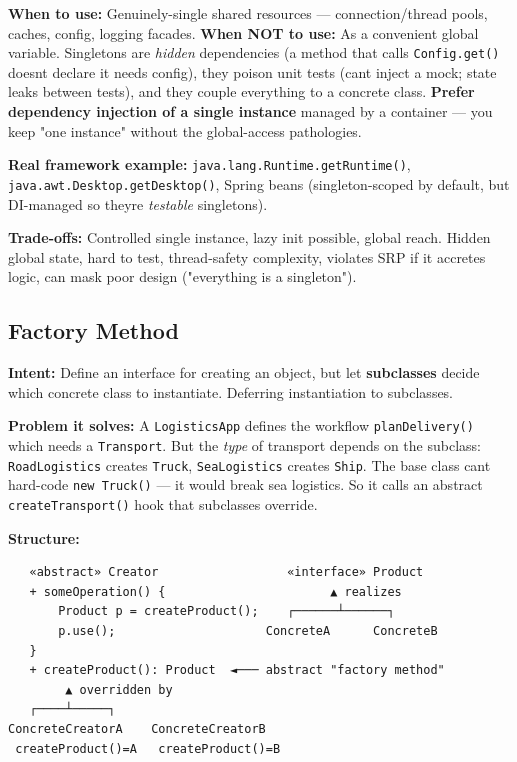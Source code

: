 \documentclass[11pt]{article}
\begin{document}
\textbf{When to use:} Genuinely-single shared resources --- connection/thread pools, caches, config, logging facades. \textbf{When NOT to use:} As a convenient global variable. Singletons are \emph{hidden} dependencies (a method that calls \texttt{Config.get()} doesn\textquotesingle t declare it needs config), they poison unit tests (can\textquotesingle t inject a mock; state leaks between tests), and they couple everything to a concrete class. \textbf{Prefer dependency injection of a single instance} managed by a container --- you keep "one instance" without the global-access pathologies.

\textbf{Real framework example:} \texttt{java.lang.Runtime.getRuntime()}, \texttt{java.awt.Desktop.getDesktop()}, Spring beans (singleton-scoped by default, but DI-managed so they\textquotesingle re \emph{testable} singletons).

\textbf{Trade-offs:} Controlled single instance, lazy init possible, global reach. Hidden global state, hard to test, thread-safety complexity, violates SRP if it accretes logic, can mask poor design ("everything is a singleton").

\subsection{Factory Method}\label{factory-method}

\textbf{Intent:} Define an interface for creating an object, but let \textbf{subclasses} decide which concrete class to instantiate. Deferring instantiation to subclasses.

\textbf{Problem it solves:} A \texttt{LogisticsApp} defines the workflow \texttt{planDelivery()} which needs a \texttt{Transport}. But the \emph{type} of transport depends on the subclass: \texttt{RoadLogistics} creates \texttt{Truck}, \texttt{SeaLogistics} creates \texttt{Ship}. The base class can\textquotesingle t hard-code \texttt{new\ Truck()} --- it would break sea logistics. So it calls an abstract \texttt{createTransport()} hook that subclasses override.

\textbf{Structure:}

\setcodelang{}

\begin{verbatim}
   «abstract» Creator                  «interface» Product
   + someOperation() {                       ▲ realizes
       Product p = createProduct();    ┌──────┴──────┐
       p.use();                     ConcreteA      ConcreteB
   }                                                
   + createProduct(): Product  ◄─── abstract "factory method"
        ▲ overridden by
   ┌────┴─────┐
ConcreteCreatorA    ConcreteCreatorB
 createProduct()=A   createProduct()=B
\end{verbatim}
\end{document}
